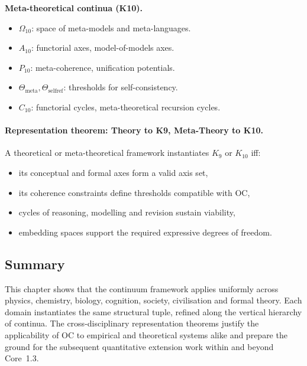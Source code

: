 \medskip\noindent\textbf{Meta-theoretical continua (K10).}
\begin{itemize}
  \item \(\Omega_{10}\): space of meta-models and meta-languages.
  \item \(A_{10}\): functorial axes, model-of-models axes.
  \item \(P_{10}\): meta-coherence, unification potentials.
  \item \(\Theta_{\mathrm{meta}}, \Theta_{\mathrm{selfref}}\): thresholds for
        self-consistency.
  \item \(C_{10}\): functorial cycles, meta-theoretical recursion cycles.
\end{itemize}

\paragraph{Representation theorem: Theory to K9, Meta-Theory to K10.}
A theoretical or meta-theoretical framework instantiates \(K_9\) or \(K_{10}\)
iff:
\begin{itemize}
  \item its conceptual and formal axes form a valid axis set,
  \item its coherence constraints define thresholds compatible with OC,
  \item cycles of reasoning, modelling and revision sustain viability,
  \item embedding spaces support the required expressive degrees of freedom.
\end{itemize}

\subsection*{Summary}

This chapter shows that the continuum framework applies uniformly across
physics, chemistry, biology, cognition, society, civilisation and formal
theory. Each domain instantiates the same structural tuple, refined along the
vertical hierarchy of continua.  
The cross-disciplinary representation theorems justify the applicability of
OC to empirical and theoretical systems alike and prepare the ground for the
subsequent quantitative extension work within and beyond Core~1.3.

